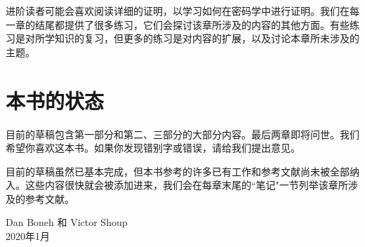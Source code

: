 进阶读者可能会喜欢阅读详细的证明，以学习如何在密码学中进行证明。我们在每一章的结尾都提供了很多练习，它们会探讨该章所涉及的内容的其他方面。有些练习是对所学知识的复习，但更多的练习是对内容的扩展，以及讨论本章所未涉及的主题。

\section*{本书的状态}

目前的草稿包含第一部分和第二、三部分的大部分内容。最后两章即将问世。我们希望你喜欢这本书。如果你发现错别字或错误，请给我们提出意见。

\begin{snote}[引用。]
目前的草稿虽然已基本完成，但本书参考的许多已有工作和参考文献尚未被全部纳入。这些内容很快就会被添加进来，我们会在每章末尾的``笔记"一节列举该章所涉及的参考文献。
\end{snote}

\vspace{50pt}

\noindent Dan Boneh 和 Victor Shoup\\
\noindent 2020年1月